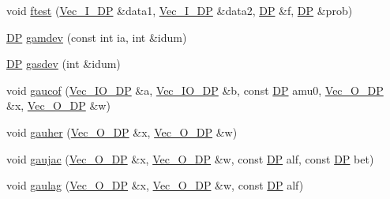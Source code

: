 \begin{DoxyCompactItemize}
\item 
void \mbox{\hyperlink{namespaceNR_a4918e1edb5dcbabd728e268dc1502a6e}{ftest}} (\mbox{\hyperlink{namespaceNR_a9f943da53862537c552e2a770cb170ae}{Vec\+\_\+\+I\+\_\+\+DP}} \&data1, \mbox{\hyperlink{namespaceNR_a9f943da53862537c552e2a770cb170ae}{Vec\+\_\+\+I\+\_\+\+DP}} \&data2, \mbox{\hyperlink{namespaceNR_af6ff762dd605ff477b8e52387253a02a}{DP}} \&f, \mbox{\hyperlink{namespaceNR_af6ff762dd605ff477b8e52387253a02a}{DP}} \&prob)
\item 
\mbox{\hyperlink{namespaceNR_af6ff762dd605ff477b8e52387253a02a}{DP}} \mbox{\hyperlink{namespaceNR_af895f3a51bb42c0b1498571d5a93c807}{gamdev}} (const int ia, int \&idum)
\item 
\mbox{\hyperlink{namespaceNR_af6ff762dd605ff477b8e52387253a02a}{DP}} \mbox{\hyperlink{namespaceNR_a035bd09228723898ec5481668f55c979}{gasdev}} (int \&idum)
\item 
void \mbox{\hyperlink{namespaceNR_a8bd178e36c704700d52a5bcb56d25548}{gaucof}} (\mbox{\hyperlink{namespaceNR_ab293e06a6bf799d8a7ed932b6852bcb8}{Vec\+\_\+\+I\+O\+\_\+\+DP}} \&a, \mbox{\hyperlink{namespaceNR_ab293e06a6bf799d8a7ed932b6852bcb8}{Vec\+\_\+\+I\+O\+\_\+\+DP}} \&b, const \mbox{\hyperlink{namespaceNR_af6ff762dd605ff477b8e52387253a02a}{DP}} amu0, \mbox{\hyperlink{namespaceNR_a970094d23441f8ef6a45282a7eb2103d}{Vec\+\_\+\+O\+\_\+\+DP}} \&x, \mbox{\hyperlink{namespaceNR_a970094d23441f8ef6a45282a7eb2103d}{Vec\+\_\+\+O\+\_\+\+DP}} \&w)
\item 
void \mbox{\hyperlink{namespaceNR_a3214b0481212ec7e5322d6952177aac6}{gauher}} (\mbox{\hyperlink{namespaceNR_a970094d23441f8ef6a45282a7eb2103d}{Vec\+\_\+\+O\+\_\+\+DP}} \&x, \mbox{\hyperlink{namespaceNR_a970094d23441f8ef6a45282a7eb2103d}{Vec\+\_\+\+O\+\_\+\+DP}} \&w)
\item 
void \mbox{\hyperlink{namespaceNR_a95634e9b78b176caeec3321c0cfa6fbf}{gaujac}} (\mbox{\hyperlink{namespaceNR_a970094d23441f8ef6a45282a7eb2103d}{Vec\+\_\+\+O\+\_\+\+DP}} \&x, \mbox{\hyperlink{namespaceNR_a970094d23441f8ef6a45282a7eb2103d}{Vec\+\_\+\+O\+\_\+\+DP}} \&w, const \mbox{\hyperlink{namespaceNR_af6ff762dd605ff477b8e52387253a02a}{DP}} alf, const \mbox{\hyperlink{namespaceNR_af6ff762dd605ff477b8e52387253a02a}{DP}} bet)
\item 
void \mbox{\hyperlink{namespaceNR_abd073d049f60560546572cb5cf2210ef}{gaulag}} (\mbox{\hyperlink{namespaceNR_a970094d23441f8ef6a45282a7eb2103d}{Vec\+\_\+\+O\+\_\+\+DP}} \&x, \mbox{\hyperlink{namespaceNR_a970094d23441f8ef6a45282a7eb2103d}{Vec\+\_\+\+O\+\_\+\+DP}} \&w, const \mbox{\hyperlink{namespaceNR_af6ff762dd605ff477b8e52387253a02a}{DP}} alf)

\end{DoxyCompactItemize}
